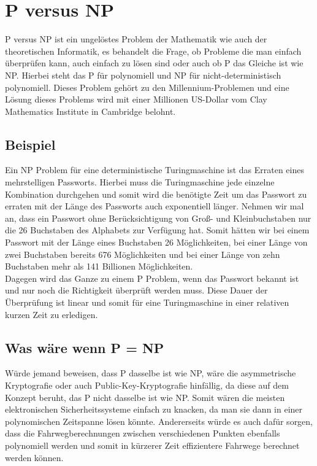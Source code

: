 \section{P versus NP}
\label{P versus NP}
P versus NP ist ein ungelöstes Problem der Mathematik wie auch der theoretischen Informatik, es behandelt die Frage, ob Probleme die man einfach überprüfen kann, auch einfach zu lösen sind oder auch ob P das Gleiche ist wie NP. Hierbei steht das P für polynomiell und NP für nicht-deterministisch polynomiell. Dieses Problem gehört zu den Millennium-Problemen und eine Lösung dieses Problems wird mit einer Millionen US-Dollar vom Clay Mathematics Institute in Cambridge belohnt.

\subsection{Beispiel}
Ein NP Problem für eine deterministische Turingmaschine ist das Erraten eines mehrstelligen Passworts. Hierbei muss die Turingmaschine jede einzelne Kombination durchgehen und somit wird die benötigte Zeit um das Passwort zu erraten mit der Länge des Passworts auch exponentiell länger. 
Nehmen wir mal an, dass ein Passwort ohne Berücksichtigung von Groß- und Kleinbuchstaben nur die 26 Buchstaben des Alphabets zur Verfügung hat. Somit hätten wir bei einem Passwort mit der Länge eines Buchstaben 26 Möglichkeiten, bei einer Länge von zwei Buchstaben bereits 676 Möglichkeiten und bei einer Länge von zehn Buchstaben mehr als 141 Billionen Möglichkeiten.
\\
Dagegen wird das Ganze zu einem P Problem, wenn das Passwort bekannt ist und nur noch die Richtigkeit überprüft werden muss. Diese Dauer der Überprüfung ist linear und somit für eine Turingmaschine in einer relativen kurzen Zeit zu erledigen.

\subsection{Was wäre wenn P = NP}
Würde jemand beweisen, dass P dasselbe ist wie NP, wäre die asymmetrische Kryptografie oder auch Public-Key-Kryptografie hinfällig, da diese auf dem Konzept beruht, das P nicht dasselbe ist wie NP. Somit wären die meisten elektronischen Sicherheitssysteme einfach zu knacken, da man sie dann in einer polynomischen Zeitspanne lösen könnte.
Andererseits würde es auch dafür sorgen, dass die Fahrwegberechnungen zwischen verschiedenen Punkten ebenfalls polynomiell werden und somit in kürzerer Zeit effizientere Fahrwege berechnet werden können.

